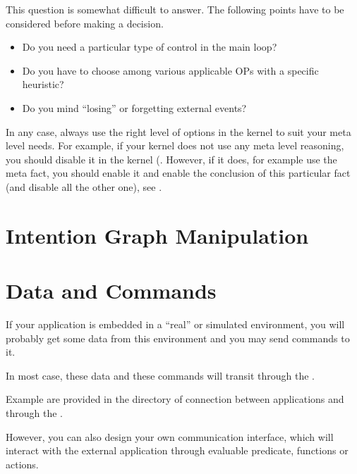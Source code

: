 This question is somewhat difficult to answer. The following points have to
be considered before making a decision.

\begin{itemize}

\item Do you need a particular type of control in the main loop?

\item Do you have to choose among various applicable OPs with a specific
heuristic?

\item Do you mind ``losing'' or forgetting external events?

\end{itemize}

In any case, always use the right level of options in the kernel to suit
your meta level needs. For example, if your kernel does not use any meta
level reasoning, you should disable it in the kernel (. However, if it does, for example use the  meta
fact, you should enable it and enable the conclusion of this particular
fact (and disable all the other one), see .

\section{Intention Graph Manipulation}


\section{Data and Commands}

If your \OPRS{} application is embedded in a ``real'' or simulated
environment, you will probably get some data from this environment and
you may send commands to it.

In most case, these data and these commands will transit through the
\MPA{}.

Example are provided in the  directory of connection between
applications and \CPK{} through the \MPA{}.

However, you can also design your own communication interface, which will
interact with the external application through evaluable predicate, functions
or actions.

